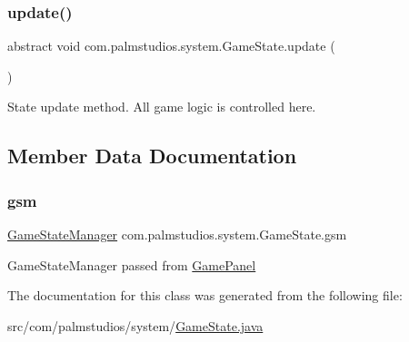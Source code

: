 \subsubsection{\texorpdfstring{update()}{update()}}
{\footnotesize\ttfamily abstract void com.\+palmstudios.\+system.\+Game\+State.\+update (\begin{DoxyParamCaption}{ }\end{DoxyParamCaption})\hspace{0.3cm}{\ttfamily [abstract]}}

State update method. All game logic is controlled here. 

\subsection{Member Data Documentation}
\mbox{\label{classcom_1_1palmstudios_1_1system_1_1_game_state_a3a9b05fb9a962eabae260371069a79eb}} 
\subsubsection{\texorpdfstring{gsm}{gsm}}
{\footnotesize\ttfamily \hyperlink{classcom_1_1palmstudios_1_1state_1_1_game_state_manager}{Game\+State\+Manager} com.\+palmstudios.\+system.\+Game\+State.\+gsm\hspace{0.3cm}{\ttfamily [protected]}}

Game\+State\+Manager passed from \hyperlink{classcom_1_1palmstudios_1_1system_1_1_game_panel}{Game\+Panel} 

The documentation for this class was generated from the following file\+:\begin{DoxyCompactItemize}
\item 
src/com/palmstudios/system/\hyperlink{_game_state_8java}{Game\+State.\+java}\end{DoxyCompactItemize}
